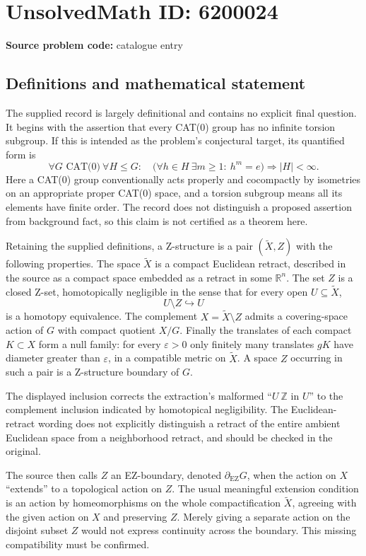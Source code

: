 \documentclass[11pt]{article}
\begin{document}
\section*{UnsolvedMath ID: 6200024}
\textbf{Source problem code:} catalogue entry
\subsection{Definitions and mathematical statement}
The supplied record is largely definitional and contains no explicit final question. It begins with the assertion that every CAT(0) group has no infinite torsion subgroup. If this is intended as the problem's conjectural target, its quantified form is
\[
 \forall G\text{ CAT(0)}\ \forall H\le G:\quad
 \bigl(\forall h\in H\ \exists m\ge1:\ h^m=e\bigr)\Longrightarrow |H|<\infty.
\]
Here a CAT(0) group conventionally acts properly and cocompactly by isometries on an appropriate proper CAT(0) space, and a torsion subgroup means all its elements have finite order. The record does not distinguish a proposed assertion from background fact, so this claim is not certified as a theorem here.

Retaining the supplied definitions, a Z-structure is a pair \((\widetilde X,Z)\) with the following properties. The space \(\widetilde X\) is a compact Euclidean retract, described in the source as a compact space embedded as a retract in some \(\mathbb R^n\). The set \(Z\) is a closed Z-set, homotopically negligible in the sense that for every open \(U\subseteq\widetilde X\),
\[
 U\setminus Z\hookrightarrow U
\]
is a homotopy equivalence. The complement \(X=\widetilde X\setminus Z\) admits a covering-space action of \(G\) with compact quotient \(X/G\). Finally the translates of each compact \(K\subset X\) form a null family: for every \(\varepsilon>0\) only finitely many translates \(gK\) have diameter greater than \(\varepsilon\), in a compatible metric on \(\widetilde X\). A space \(Z\) occurring in such a pair is a Z-structure boundary of \(G\).

The displayed inclusion corrects the extraction's malformed ``\(U\ \mathbb Z\) in \(U\)'' to the complement inclusion indicated by homotopical negligibility. The Euclidean-retract wording does not explicitly distinguish a retract of the entire ambient Euclidean space from a neighborhood retract, and should be checked in the original.

The source then calls \(Z\) an EZ-boundary, denoted \(\partial_{\mathrm{EZ}}G\), when the action on \(X\) ``extends'' to a topological action on \(Z\). The usual meaningful extension condition is an action by homeomorphisms on the whole compactification \(\widetilde X\), agreeing with the given action on \(X\) and preserving \(Z\). Merely giving a separate action on the disjoint subset \(Z\) would not express continuity across the boundary. This missing compatibility must be confirmed.
\end{document}
